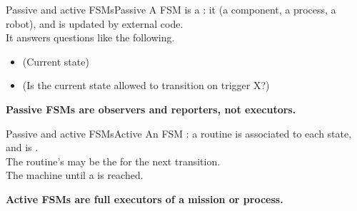\begin{frame}{Passive and active FSMs}{Passive}
  \justifying
  A  FSM is a : it  (a component, a process, a robot), and is updated by external code.\\
  \bigskip
   It answers questions like the following.
  \begin{itemize}
    \item {} (Current state)
    \item {} (Is the current state allowed to transition on trigger X?)
  \end{itemize}
  \bigskip
  \begin{block}{}
    \centering
    \textbf{Passive FSMs are observers and reporters, not executors.}
  \end{block}
\end{frame}
\begin{frame}{Passive and active FSMs}{Active}
  \justifying
  An  FSM : a routine is associated to each state, and is .\\
  \bigskip
  The routine's  may be the  for the next transition.\\
  The machine  until a  is reached.\\
  \bigskip
  \begin{block}{}
    \centering
    \textbf{Active FSMs are full executors of a mission or process.}
  \end{block}
\end{frame}

